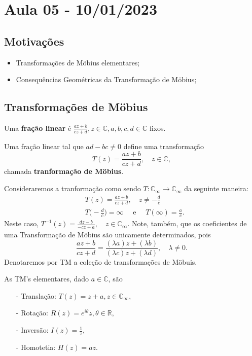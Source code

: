 \documentclass[ComplexAnalysis/complex.tex]{subfiles}
\begin{document}
\section{Aula 05 - 10/01/2023}
\subsection{Motivações}
\begin{itemize}
	\item Transformações de M\"{o}bius elementares;
	\item Consequências Geométricas da Transformação de M\"{o}bius;
\end{itemize}
\subsection{Transformações de M\"{o}bius}
\begin{def*}
	Uma \textbf{fração linear} é $\frac{az + b}{cz + d}, z\in \mathbb{C}, a, b, c, d\in \mathbb{C}$ fixos.
\end{def*}
\begin{def*}
	Uma fração linear tal que $ad-bc\neq0$ define uma transformação
	$$
		T(z) = \frac{az + b}{cz + d}, \quad z\in \mathbb{C},
	$$
	chamada \textbf{tranformação de M\"{o}bius}.
\end{def*}
Consideraremos a tranformação como sendo $T:\mathbb{C}_{\infty}\rightarrow \mathbb{C}_{\infty}$ da seguinte
maneira:
\begin{align*}
	 & T(z) = \frac{az + b}{cz + d}, \quad z\neq -\frac{d}{c}                             \\
	 & T\biggl(-\frac{d}{c}\biggr) = \infty \quad\text{ e }\quad T(\infty) = \frac{a}{c}.
\end{align*}
Neste caso, $T ^{-1}(z) = \displaystyle\frac{dz - b}{-cz + a}, \quad z\in \mathbb{C}_{\infty}.$ Note, também, que os coeficientes
de uma Transformação de M\"{o}bius são unicamente determinados, pois
$$
	\frac{az + b}{cz + d} = \frac{(\lambda a)z + (\lambda b)}{(\lambda c)z + (\lambda d)}, \quad \lambda\neq0.
$$
Denotaremos por TM a coleção de transformações de M\"{o}buis.
\begin{example}
	As TM's elementares, dado $a\in \mathbb{C}$, são
	\begin{itemize}
		\item[-] Translação: $T(z) = z + a, z\in \mathbb{C}_{\infty},$
		\item[-] Rotação: $R(z) = e^{i \theta}z, \theta\in \mathbb{R},$
		\item[-] Inversão: $I(z) = \frac{1}{z},$
		\item[-] Homotetia: $H(z) = az.$
	\end{itemize}
\end{example}
\end{document}

